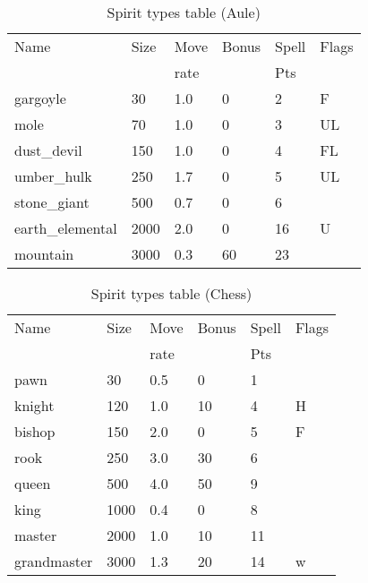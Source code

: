 \begin{same}
\begin{table}[hbpt]
\caption{Spirit types table (Aule)}
\begin{center}
\begin{tabular}{ || l | l | l | l | l | l || }
\hline
Name            & Size & Move & Bonus &Spell&Flags\\
                &      & rate &       &Pts  &\\
\hline
gargoyle        &   30 & 1.0 &   0 &  2 &F\\
mole            &   70 & 1.0 &   0 &  3 &UL\\
dust_devil      &  150 & 1.0 &   0 &  4 &FL\\
umber_hulk      &  250 & 1.7 &   0 &  5 &UL\\
stone_giant     &  500 & 0.7 &   0 &  6 &\\
earth_elemental & 2000 & 2.0 &   0 & 16 &U\\
mountain        & 3000 & 0.3 &  60 & 23 &\\
\hline
\end{tabular}
\end{center}
\end{table}
\end{same}
\begin{same}
\begin{table}[hbpt]
\caption{Spirit types table (Chess)}
\begin{center}
\begin{tabular}{ || l | l | l | l | l | l || }
\hline
Name            & Size & Move & Bonus &Spell&Flags\\
                &      & rate &       &Pts  &\\
\hline
pawn            &   30 & 0.5 &   0 &  1 &\\
knight          &  120 & 1.0 &  10 &  4 &H\\
bishop          &  150 & 2.0 &   0 &  5 &F\\
rook            &  250 & 3.0 &  30 &  6 &\\
queen           &  500 & 4.0 &  50 &  9 &\\
king            & 1000 & 0.4 &   0 &  8 &\\
master          & 2000 & 1.0 &  10 & 11 &\\
grandmaster     & 3000 & 1.3 &  20 & 14 &w\\
\hline
\end{tabular}
\end{center}
\end{table}
\end{same}
